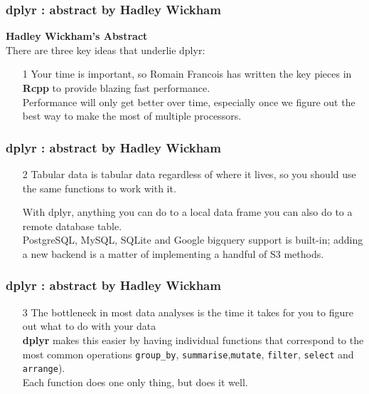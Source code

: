 \documentclass{beamer}
\begin{document}
	\begin{frame}
		\frametitle{dplyr : abstract by Hadley Wickham}	
		\textbf{Hadley Wickham's Abstract}\\
		\noindent There are three key ideas that underlie dplyr:
		
		\begin{enumerate}
			\item[1] Your time is important, so Romain Francois has written the key pieces in \textbf{Rcpp} to provide blazing fast performance. \\ \bigskip Performance will only get better over time, especially once we figure out the best way to make the most of multiple processors. 
		\end{enumerate}
	\end{frame}
	\begin{frame}
		\frametitle{dplyr : abstract by Hadley Wickham}	
		
		\begin{enumerate}
			\item[2] Tabular data is tabular data regardless of where it lives, so you should use the same functions to work with it. \\ \bigskip
			
			With dplyr, anything you can do to a local data frame you can also do to a remote database table. \\ \bigskip PostgreSQL, MySQL, SQLite and Google bigquery support is built-in; adding a new backend is a matter of implementing a handful of S3 methods. 
		\end{enumerate}
	\end{frame}
	\begin{frame}
		\frametitle{dplyr : abstract by Hadley Wickham}	
		
		\begin{enumerate}
			\item[3] The bottleneck in most data analyses is the time it takes for you to figure out what to do with your data
			\\ \bigskip \textbf{dplyr} makes this easier by having individual functions that correspond to the most common operations  \texttt{group\_by}, \texttt{summarise},\texttt{mutate}, \texttt{filter}, \texttt{select} and \texttt{arrange}). 	\\ \bigskip Each function does one only thing, but does it well.
		\end{enumerate}
	\end{frame}
	
\end{document}
